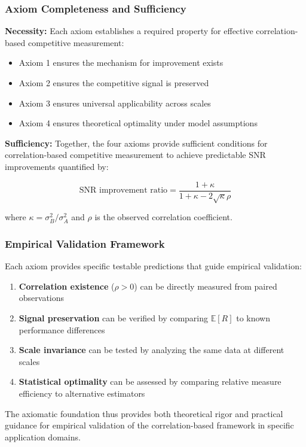 \subsubsection{Axiom Completeness and Sufficiency}

\textbf{Necessity:} Each axiom establishes a required property for effective correlation-based competitive measurement:
\begin{itemize}
    \item Axiom 1 ensures the mechanism for improvement exists
    \item Axiom 2 ensures the competitive signal is preserved  
    \item Axiom 3 ensures universal applicability across scales
    \item Axiom 4 ensures theoretical optimality under model assumptions
\end{itemize}

\textbf{Sufficiency:} Together, the four axioms provide sufficient conditions for correlation-based competitive measurement to achieve predictable SNR improvements quantified by:

$$\text{SNR improvement ratio} = \frac{1 + \kappa}{1 + \kappa - 2\sqrt{\kappa}\rho}$$

where $\kappa = \sigma_B^2/\sigma_A^2$ and $\rho$ is the observed correlation coefficient.

\subsubsection{Empirical Validation Framework}

Each axiom provides specific testable predictions that guide empirical validation:

\begin{enumerate}
    \item \textbf{Correlation existence} ($\rho > 0$) can be directly measured from paired observations
    \item \textbf{Signal preservation} can be verified by comparing $\mathbb{E}[R]$ to known performance differences  
    \item \textbf{Scale invariance} can be tested by analyzing the same data at different scales
    \item \textbf{Statistical optimality} can be assessed by comparing relative measure efficiency to alternative estimators
\end{enumerate}

The axiomatic foundation thus provides both theoretical rigor and practical guidance for empirical validation of the correlation-based framework in specific application domains.

